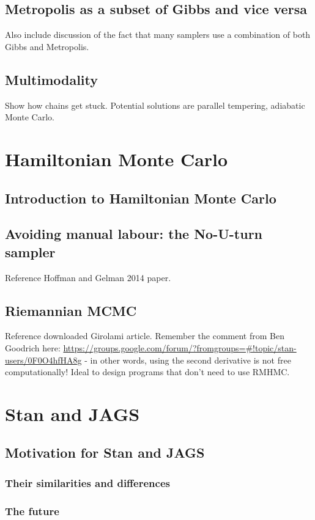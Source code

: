 \documentclass[11pt,fullpage]{book}
\begin{document}
\section{Metropolis as a subset of Gibbs and vice versa}
Also include discussion of the fact that many samplers use a combination of both Gibbs and Metropolis.
\section{Multimodality}
Show how chains get stuck. Potential solutions are parallel tempering, adiabatic Monte Carlo.

\chapter{Hamiltonian Monte Carlo}\label{chap:HMC}
\section{Introduction to Hamiltonian Monte Carlo}
\section{Avoiding manual labour: the No-U-turn sampler}
Reference Hoffman and Gelman 2014 paper.
\section{Riemannian MCMC}
Reference downloaded Girolami article.
Remember the comment from Ben Goodrich here: \url{https://groups.google.com/forum/?fromgroups=#!topic/stan-users/0F0O4hfHA8g} - in other words, using the second derivative is not free computationally! Ideal to design programs that don't need to use RMHMC.

\chapter{Stan and JAGS}\label{chap:StanJAGS}
\section{Motivation for Stan and JAGS}
\subsection{Their similarities and differences}
\subsection{The future}
\end{document}
